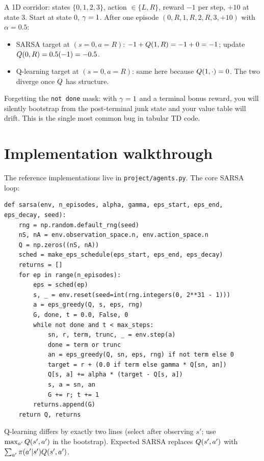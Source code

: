 \documentclass[11pt,oneside]{scrbook}
\begin{document}
\begin{example}
A 1D corridor: states $\{0,1,2,3\}$, action $\in \{L,R\}$, reward $-1$ per step, $+10$ at
state $3$. Start at state $0$, $\gamma = 1$. After one episode
$(0,R,1,R,2,R,3,+10)$ with $\alpha = 0.5$:
\begin{itemize}
  \item SARSA target at $(s=0,a=R)$: $-1 + Q(1,R) = -1 + 0 = -1$; update
        $Q(0,R) = 0.5(-1) = -0.5$.
  \item Q-learning target at $(s=0,a=R)$: same here because $Q(1,\cdot) = 0$. The two
        diverge once $Q$ has structure.
\end{itemize}
\end{example}

\begin{pitfall}
Forgetting the \texttt{not done} mask: with $\gamma=1$ and a terminal bonus reward, you
will silently bootstrap from the post-terminal junk state and your value table will drift.
This is the single most common bug in tabular TD code.
\end{pitfall}

\chapter{Implementation walkthrough}

The reference implementations live in \texttt{project/agents.py}. The core SARSA loop:

\begin{verbatim}
def sarsa(env, n_episodes, alpha, gamma, eps_start, eps_end, eps_decay, seed):
    rng = np.random.default_rng(seed)
    nS, nA = env.observation_space.n, env.action_space.n
    Q = np.zeros((nS, nA))
    sched = make_eps_schedule(eps_start, eps_end, eps_decay)
    returns = []
    for ep in range(n_episodes):
        eps = sched(ep)
        s, _ = env.reset(seed=int(rng.integers(0, 2**31 - 1)))
        a = eps_greedy(Q, s, eps, rng)
        G, done, t = 0.0, False, 0
        while not done and t < max_steps:
            sn, r, term, trunc, _ = env.step(a)
            done = term or trunc
            an = eps_greedy(Q, sn, eps, rng) if not term else 0
            target = r + (0.0 if term else gamma * Q[sn, an])
            Q[s, a] += alpha * (target - Q[s, a])
            s, a = sn, an
            G += r; t += 1
        returns.append(G)
    return Q, returns
\end{verbatim}

Q-learning differs by exactly two lines (select after observing $s'$; use $\max_{a'}
Q(s',a')$ in the bootstrap). Expected SARSA replaces $Q(s',a')$ with
$\sum_{a'}\pi(a'|s')Q(s',a')$.
\end{document}
